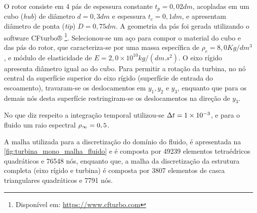 O rotor consiste em 4 pás de espessura constante $t_p = 0,02dm$, acopladas em um cubo (\textit{hub}) de diâmetro  $d = 0,3dm$ e espessura $t_c=0,1dm$, e apresentam diâmetro de ponta (\textit{tip}) $D=0,75dm$. A geometria da pás foi gerada utilizando o software CFturbo® \footnote{Disponível em: \url{https://www.cfturbo.com}}. Selecionou-se um aço para compor o material do cubo e das pás do rotor, que caracteriza-se por uma massa específica de $\rho_{e} =  8,0 Kg/dm^3 $, e módulo de elasticidade de $E = 2,0\times10^{10} kg/(dm.s^2)$. O eixo rígido apresenta diâmetro igual ao do cubo. Para permitir a rotação da turbina, no nó central da superfície superior do eixo rígido (superfície de entrada do escoamento), travaram-se os deslocamentos em $y_1,y_2$ e $y_3$, enquanto que para os demais nós desta superfície restringiram-se os deslocamentos na direção de $y_3$.

No que diz respeito a integração temporal utilizou-se $\Delta t = 1\times10^{-3}$, e para o fluido um raio espectral $\rho_\infty = 0,5$.

A malha utilizada para a discretização do domínio do fluido, é apresentada na \autoref{fig:turbina_mono_malha_fluido} e é composta por 49239 elementos tetraédricos quadráticos e 76548 nós, enquanto que, a malha da discretização da estrutura completa (eixo rígido e turbina) é composta por 3807 elementos de casca triangulares quadráticos e 7791 nós.

